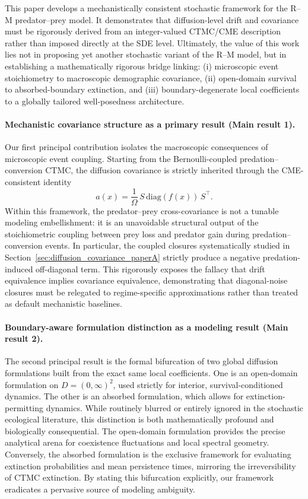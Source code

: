 \documentclass[pdflatex,sn-mathphys-ay]{sn-jnl}
\theoremstyle{thmstyleone}
\theoremstyle{definition}
\theoremstyle{remark}
\begin{document}
This paper develops a mechanistically consistent stochastic framework for the R--M predator--prey model.
It demonstrates that diffusion-level drift and covariance must be rigorously derived from an integer-valued CTMC/CME description rather than imposed directly at the SDE level. 
Ultimately, the value of this work lies not in proposing yet another stochastic variant of the R--M model, but in establishing a mathematically rigorous bridge linking:
(i) microscopic event stoichiometry to macroscopic demographic covariance,
(ii) open-domain survival to absorbed-boundary extinction, and 
(iii) boundary-degenerate local coefficients to a globally tailored well-posedness architecture.

\paragraph{Mechanistic covariance structure as a primary result (Main result 1).}
Our first principal contribution isolates the macroscopic consequences of microscopic event coupling.
Starting from the Bernoulli-coupled predation--conversion CTMC, the diffusion covariance is strictly inherited through the CME-consistent identity
\[
a(x)=\frac{1}{\Omega}\,S\,\mathrm{diag}(f(x))\,S^\top.
\]
Within this framework, the predator--prey cross-covariance is not a tunable modeling embellishment: it is an unavoidable structural output of the stoichiometric coupling between prey loss and predator gain during predation--conversion events. 
In particular, the coupled closures systematically studied in Section~\ref{sec:diffusion_covariance_paperA} strictly produce a negative predation-induced off-diagonal term.
This rigorously exposes the fallacy that drift equivalence implies covariance equivalence, 
demonstrating that diagonal-noise closures must be relegated to regime-specific approximations rather than treated as default mechanistic baselines.

\paragraph{Boundary-aware formulation distinction as a modeling result (Main result 2).}
The second principal result is the formal bifurcation of two global diffusion formulations built from the exact same local coefficients.
One is an open-domain formulation on \(D=(0,\infty)^2\), used strictly for interior, survival-conditioned dynamics.
The other is an absorbed formulation, which allows for extinction-permitting dynamics. 
While routinely blurred or entirely ignored in the stochastic ecological literature, this distinction is both mathematically profound and biologically consequential. 
The open-domain formulation provides the precise analytical arena for coexistence fluctuations and local spectral geometry.
Conversely, the absorbed formulation is the exclusive framework for evaluating extinction probabilities and mean persistence times, mirroring the irreversibility of CTMC extinction.
By stating this bifurcation explicitly, our framework eradicates a pervasive source of modeling ambiguity.
\end{document}

